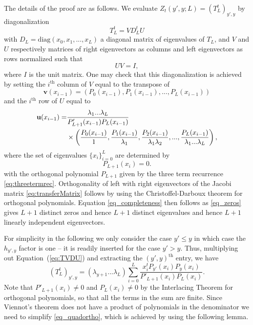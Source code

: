\documentclass[11pt,a4paper]{article}
\newcommand{\la}{\lambda}
\begin{document}
 
The details of the proof are as follows. We evaluate $Z_t(y',y;L)=(T_L^t)_{y',y}$ by  diagonalization
\begin{equation} \label{eq:TVDU}
T_L^t = V D_L^t U
\end{equation}
with $D_L=\text{diag}(x_0, x_1, ..., x_L)$ a diagonal matrix of eigenvalues of $T_L$, and $V$ and $U$ respectively matrices of right eigenvectors as columns and left eigenvectors as rows normalized such that
\begin{equation}
UV=I,
\label{eq_completeness}
\end{equation}
where $I$ is the unit matrix.
One may check that this diagonalization is achieved by setting the $i^\text{th}$ column  of $V$ equal to the transpose of
\begin{equation}
\mathbf{v}(x_{i-1}) = \left ( P_0(x_{i-1}), P_1(x_{i-1}), ..., P_L(x_{i-1})\right ) 
\end{equation}
and the $i^\text{th}$ row  of $U$ equal to
\begin{align}
\mathbf{u}(x_{i-1})=&\frac{\la_1 ... \la_L}{P'_{L+1}(x_{i-1})P_L(x_{i-1})}\notag\\ 
&\times\left (\frac{P_0(x_{i-1})}{1}, \frac{P_1(x_{i-1})}{\la_1}, \frac{P_2(x_{i-1})}{\la_1 \la_2}, ..., \frac{P_L(x_{i-1})}{\la_1 ... \la_L} \right),
\end{align}
where the set of eigenvalues $\{x_i\}_{i=0}^L$ are determined by
\begin{equation}
P_{L+1}(x_i)=0.
\label{eq_zeros}
\end{equation}
with the orthogonal polynomial $P_{L+1}$ given by the three term recurrence \eqref{eq:threetermrec}.
Orthogonality of left with right eigenvectors of the Jacobi matrix \eqref{eq:transferMatrix} follows by using the Christoffel-Darboux theorem for orthogonal polynomials. Equation \eqref{eq_completeness} then follows as \eqref{eq_zeros} gives $L+1$ distinct zeros and hence $L+1$ distinct eigenvalues and hence $L+1$ linearly independent eigenvectors.

For simplicity in the following we only consider the case $y'\le y$ in which case the $h_{y',y}$ factor is one -- it is readily inserted for the case $y' > y$. Thus, multiplying out Equation~(\ref{eq:TVDU}) and extracting the $(y', y)^{\text{th}}$ entry, we have
\begin{equation}
(T_L^t)_{y',y} =(\la_{y+1} ... \la_L) \sum_{i=0}^L \frac{x_i^t P_{y'}(x_i)P_y(x_i) }{P'_{L+1}(x_i)P_L(x_i)}. 
\label{eq_quadortho}
\end{equation}
Note that $P'_{L+1}(x_i) \ne 0$ and $P_L(x_i)\ne 0$ by the Interlacing Theorem for orthogonal polynomials, so that all the terms in the sum are finite. 
Since Viennot's theorem does not have a product of polynomials in the denominator we need to simplify \eqref{eq_quadortho}, which is achieved by using the following lemma.
\end{document}
